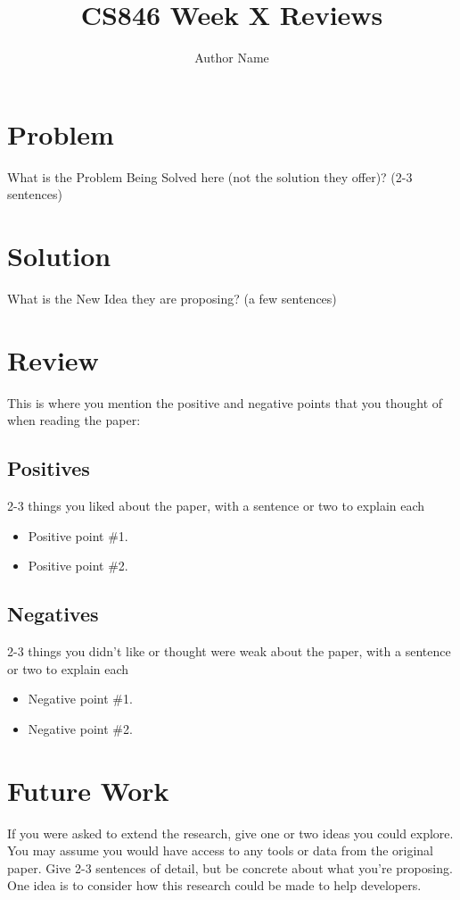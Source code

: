\documentclass[sigconf]{acmart}
\begin{document}
\title[Short Title]{CS846 Week X Reviews}
\author{Author Name}
\maketitle
\balance
\section{Problem}
What is the Problem Being Solved here (not the solution they offer)? (2-3 sentences)
\section{Solution}
What is the New Idea they are proposing?  (a few sentences)
\section{Review}
This is where you mention the positive and negative points that you thought of when reading the paper:
\subsection{Positives}
2-3 things you liked about the paper, with a sentence or two to explain each
\begin{itemize}
    \item Positive point \#1.
    \item Positive point \#2.
\end{itemize}

\subsection{Negatives}
2-3 things you didn't like or thought were weak about the paper, with a sentence or two to explain each
\begin{itemize}
    \item Negative point \#1.
    \item Negative point \#2.
\end{itemize}

\section{Future Work}
If you were asked to extend the research, give one or two ideas you could explore.  You may assume you would have access to any tools or data from the original paper.  Give 2-3 sentences of detail, but be concrete about what you're proposing.  One idea is to consider how this research could be made to help developers.
\end{document}
